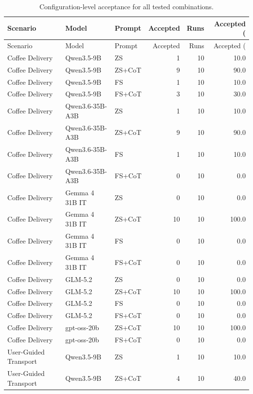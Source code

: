 \begin{longtable}{lllrrr}
\caption{Configuration-level acceptance for all tested combinations.} \label{tab:config-detail} \\
\toprule
Scenario & Model & Prompt & Accepted & Runs & Accepted (%
\midrule
\endfirsthead
\caption[]{Configuration-level acceptance for all tested combinations.} \\
\toprule
Scenario & Model & Prompt & Accepted & Runs & Accepted (%
\midrule
\endhead
\midrule
\multicolumn{6}{r}{Continued on next page} \\
\midrule
\endfoot
\bottomrule
\endlastfoot
Coffee Delivery & Qwen3.5-9B & ZS & 1 & 10 & 10.0 \\
Coffee Delivery & Qwen3.5-9B & ZS+CoT & 9 & 10 & 90.0 \\
Coffee Delivery & Qwen3.5-9B & FS & 1 & 10 & 10.0 \\
Coffee Delivery & Qwen3.5-9B & FS+CoT & 3 & 10 & 30.0 \\
Coffee Delivery & Qwen3.6-35B-A3B & ZS & 1 & 10 & 10.0 \\
Coffee Delivery & Qwen3.6-35B-A3B & ZS+CoT & 9 & 10 & 90.0 \\
Coffee Delivery & Qwen3.6-35B-A3B & FS & 1 & 10 & 10.0 \\
Coffee Delivery & Qwen3.6-35B-A3B & FS+CoT & 0 & 10 & 0.0 \\
Coffee Delivery & Gemma 4 31B IT & ZS & 0 & 10 & 0.0 \\
Coffee Delivery & Gemma 4 31B IT & ZS+CoT & 10 & 10 & 100.0 \\
Coffee Delivery & Gemma 4 31B IT & FS & 0 & 10 & 0.0 \\
Coffee Delivery & Gemma 4 31B IT & FS+CoT & 0 & 10 & 0.0 \\
Coffee Delivery & GLM-5.2 & ZS & 0 & 10 & 0.0 \\
Coffee Delivery & GLM-5.2 & ZS+CoT & 10 & 10 & 100.0 \\
Coffee Delivery & GLM-5.2 & FS & 0 & 10 & 0.0 \\
Coffee Delivery & GLM-5.2 & FS+CoT & 0 & 10 & 0.0 \\
Coffee Delivery & gpt-oss-20b & ZS+CoT & 10 & 10 & 100.0 \\
Coffee Delivery & gpt-oss-20b & FS+CoT & 0 & 10 & 0.0 \\
User-Guided Transport & Qwen3.5-9B & ZS & 1 & 10 & 10.0 \\
User-Guided Transport & Qwen3.5-9B & ZS+CoT & 4 & 10 & 40.0 \\

\end{longtable}
